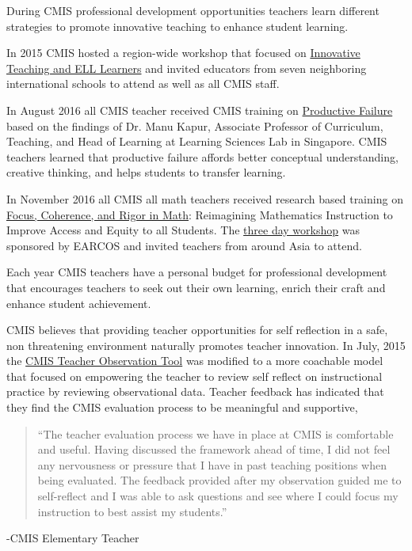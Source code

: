 \begin{findings}
During CMIS professional development opportunities teachers learn different strategies to promote innovative teaching to enhance student learning.


In 2015 CMIS hosted a region-wide workshop that focused on \href{https://docs.google.com/forms/d/e/1FAIpQLSdK2QvcDZyM_yfhT22BgModehhwhn3I8Ps6VoW2EIzaK-qing/viewform?c=0&w=1}{ Innovative Teaching and  ELL Learners} and invited educators from seven neighboring international schools to attend as well as all CMIS staff. 

In August 2016 all CMIS teacher received CMIS training on \href{https://docs.google.com/a/cmis.ac.th/presentation/d/1S1x1yEj7KDD6jM7u1RdTZJEt10_0r6mcJ-LmRb6iPWs/edit?usp=sharing}{Productive Failure}  based on the findings of Dr. Manu Kapur, Associate Professor of Curriculum, Teaching, and Head of Learning at Learning Sciences Lab in Singapore. CMIS teachers learned that productive failure affords better conceptual understanding, creative thinking, and helps students to transfer learning.

In November 2016 all CMIS all math teachers received research based training on \href{https://drive.google.com/a/cmis.ac.th/file/d/0ByVFfrm0zfolSXFEZFJVN1VOaTQ/view?usp=sharing}{Focus, Coherence, and Rigor in Math}: Reimagining Mathematics Instruction to Improve Access and Equity to all Students. The \href{https://docs.google.com/document/d/14wHOzYz9lk79YGv4aYLtMEkqAN0Z6vBBI3POYZPeIC4/edit?usp=sharing}{three day workshop} was sponsored by EARCOS and invited teachers from around Asia to attend. 

Each year CMIS teachers have a personal budget for professional development that encourages teachers to seek out their own learning, enrich their craft and enhance student achievement.

CMIS believes that providing teacher opportunities for self reflection in a safe, non threatening environment naturally promotes teacher innovation. In July, 2015 the \href{https://docs.google.com/document/d/15_5X5QtixmWVheEUBVO9N1aislsLDm_ZW4-4g4YQ7F4/edit?usp=sharing}{CMIS Teacher Observation Tool} was modified to a more coachable model that  focused on empowering the teacher to review self reflect on instructional practice by reviewing observational data. Teacher feedback has indicated that they find the CMIS evaluation process to be meaningful and supportive,

\blockquote{``The teacher evaluation process we have in place at CMIS is comfortable and useful. Having discussed the framework ahead of time, I did not feel any nervousness or pressure that I have in past teaching positions when being evaluated. The feedback provided after my observation guided me to self-reflect and I was able to ask questions and see where I could focus my instruction to best assist my students.''} -CMIS Elementary Teacher


\end{findings}

